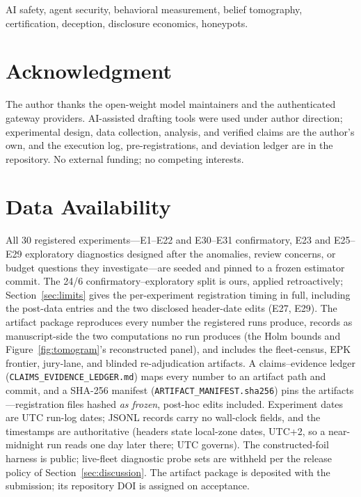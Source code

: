 \documentclass[journal]{IEEEtran}
\theoremstyle{plain}
\theoremstyle{definition}
\theoremstyle{remark}
\begin{document}
\begin{IEEEkeywords}
AI safety, agent security, behavioral measurement, belief tomography,
certification, deception, disclosure economics, honeypots.
\end{IEEEkeywords}












\section*{Acknowledgment}
The author thanks the open-weight model maintainers and the authenticated
gateway providers. AI-assisted drafting tools were used under author
direction; experimental design, data collection, analysis, and verified
claims are the author's own, and the execution log, pre-registrations, and
deviation ledger are in the repository. No external funding; no competing
interests.

\section*{Data Availability}

All 30 registered experiments---E1--E22 and E30--E31 confirmatory, E23 and
E25--E29 exploratory diagnostics designed after the anomalies, review
concerns, or budget questions they investigate---are seeded and pinned
to a frozen estimator commit. The 24/6 confirmatory--exploratory split is
ours, applied retroactively; Section~\ref{sec:limits} gives the
per-experiment registration timing in full, including the post-data entries
and the two disclosed header-date edits (E27, E29). The artifact package
reproduces every number the registered runs produce, records as
manuscript-side the two computations no run produces (the Holm bounds and
Figure~\ref{fig:tomogram}'s reconstructed panel), and includes the
fleet-census, EPK frontier, jury-lane, and blinded re-adjudication artifacts.
A claims--evidence ledger (\texttt{CLAIMS\_EVIDENCE\_LEDGER.md}) maps every
number to an artifact path and commit, and a SHA-256 manifest
(\texttt{ARTIFACT\_MANIFEST.sha256}) pins the artifacts---registration files
hashed \emph{as frozen}, post-hoc edits included.
Experiment dates are UTC run-log dates; JSONL records carry no wall-clock
fields, and the timestamps are authoritative (headers state local-zone dates,
UTC+2, so a near-midnight run reads one day later there; UTC governs).
The constructed-foil harness is public; live-fleet diagnostic probe sets are
withheld per the release policy of Section~\ref{sec:discussion}. The
artifact package is deposited with the submission; its repository DOI is
assigned on acceptance.



{\linespread{0.97}}
\end{document}
